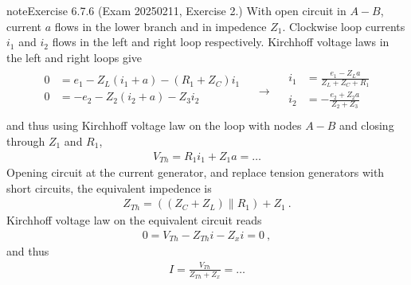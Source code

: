 \documentclass[letterpaper,10pt,english]{jupyterBook}
\begin{document}
\begin{sphinxadmonition}{note}{Exercise 6.7.6 (Exam 2025\sphinxhyphen{}02\sphinxhyphen{}11, Exercise 2.)}
\sphinxAtStartPar
{} With open circuit in \(A-B\), current \(a\) flows in the lower branch and in impedence \(Z_1\). Clockwise loop currents \(i_1\) and \(i_2\) flows in the left and right loop respectively. Kirchhoff voltage laws in the left and right loops give
\begin{equation*}
\begin{split}\begin{aligned}
  0 & = e_1 - Z_L (i_1 + a) - (R_1 + Z_C) i_1 \\
  0 & = -e_2 - Z_2 (i_2 + a) - Z_3 i_2 \\
\end{aligned}
\quad \rightarrow \quad
\begin{aligned}
  i_1 & = \frac{e_1 - Z_L a}{Z_L + Z_C + R_1} \\
  i_2 & = -\frac{e_2 + Z_2 a}{Z_2 + Z_3} \\
\end{aligned}\end{split}
\end{equation*}
\sphinxAtStartPar
and thus using Kirchhoff voltage law on the loop with nodes \(A-B\) and closing through \(Z_1\) and \(R_1\),
\begin{equation*}
\begin{split}V_{Th} = R_1 i_1 + Z_1 a = \dots\end{split}
\end{equation*}
\sphinxAtStartPar
{} Opening circuit at the current generator, and replace tension generators with short circuits, the equivalent impedence is
\begin{equation*}
\begin{split}Z_{Th} = ( (Z_C + Z_L) \parallel R_1) + Z_1 \ .\end{split}
\end{equation*}
\sphinxAtStartPar
{} Kirchhoff voltage law on the equivalent circuit reads
\begin{equation*}
\begin{split}0 = V_{Th} - Z_{Th} i - Z_{x} i = 0 \ ,\end{split}
\end{equation*}
\sphinxAtStartPar
and thus
\begin{equation*}
\begin{split}I = \frac{V_{Th}}{Z_{Th} + Z_{x}} = \dots\end{split}
\end{equation*}

\end{sphinxadmonition}
\end{document}
